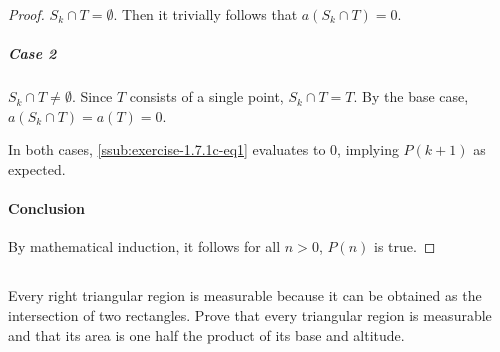 \documentclass{report}
\begin{document}
\begin{proof}
      $S_k \cap T = \emptyset$.
      Then it trivially follows that $a(S_k \cap T) = 0$.

    \subparagraph{Case 2}%

      $S_k \cap T \neq \emptyset$.
      Since $T$ consists of a single point, $S_k \cap T = T$.
      By the base case, $a(S_k \cap T) = a(T) = 0$.

    \vspace{8pt}
    \noindent
    In both cases, \eqref{ssub:exercise-1.7.1c-eq1} evaluates to $0$, implying
      $P(k + 1)$ as expected.

  \paragraph{Conclusion}%

    By mathematical induction, it follows for all $n > 0$, $P(n)$ is true.

\end{proof}

\subsection{}%
\label{sub:exercise-1.7.2}

Every right triangular region is measurable because it can be obtained as the
  intersection of two rectangles.
Prove that every triangular region is measurable and that its area is one half
  the product of its base and altitude.
\end{document}
